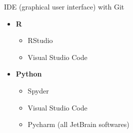 \documentclass[10pt]{beamer}
\begin{document}
\begin{frame}{IDE (graphical user interface) with Git}
    \begin{itemize}
        \item \textbf{R}
        \begin{itemize}
            \item RStudio
            \item Visual Studio Code
        \end{itemize}
        \vspace{0.2cm}
        \item \textbf{Python}
        \begin{itemize}
            \item Spyder
            \item Visual Studio Code
            \item Pycharm (all JetBrain softwares)
        \end{itemize}
    \end{itemize}
\end{frame}
\end{document}
